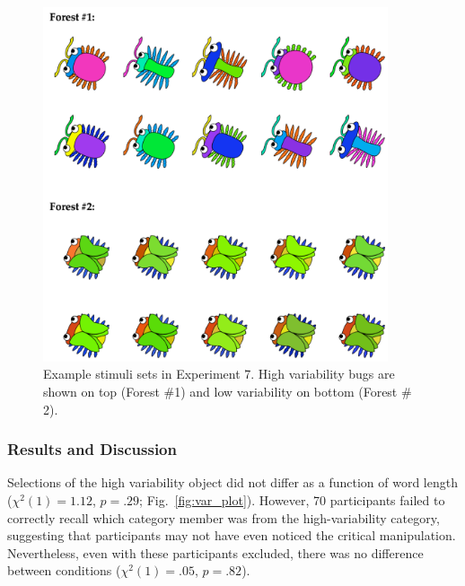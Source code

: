   \begin{figure}[t!]
 \begin{center}
  \includegraphics[width=4in]{figs/var_screen_shot.png}
  \caption{\label{fig:var_screen_shot} Example stimuli sets in Experiment 7. High variability bugs are shown on top (Forest \#1) and low variability on bottom (Forest \# 2).}
 \end{center}
\end{figure}

\subsubsection{Results and Discussion}

Selections of the high variability object did not differ as a function of word length (${\chi}^2$$(1) = 1.12$, $p = .29$; Fig.\ \ref{fig:var_plot}). However, 70 participants failed to correctly recall which category member was from the high-variability category, suggesting that participants may not have even noticed the critical manipulation. Nevertheless, even with these participants excluded, there was no difference between conditions (${\chi}^2$$(1) = .05$, $p = .82$).


